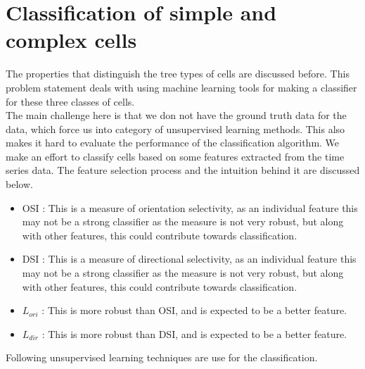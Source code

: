 \documentclass[11pt]{article}
\begin{document}
\section{Classification of simple and complex cells} %
\label{sub:classification_of_simple_and_complex_cells}
The properties that distinguish the tree types of cells are discussed before. This problem statement deals with using machine learning tools for making a classifier for these three classes of cells.\\
The main challenge here is that we don not have the ground truth data for the data, which force us into category of unsupervised learning methods. This also makes it hard to evaluate the performance of the classification algorithm. We make an effort to classify cells based on some features extracted from the time series data. The feature selection process and the intuition behind it are discussed below.
\begin{itemize}
    \item OSI : This is a measure of orientation selectivity, as an individual feature this may not be a strong classifier as the measure is not very robust, but along with other features, this could contribute towards classification.
    \item DSI : This is a measure of directional selectivity, as an individual feature this may not be a strong classifier as the measure is not very robust, but along with other features, this could contribute towards classification.
    \item $L_{ori}$ : This is more robust than OSI, and is expected to be a better feature.
    \item $L_{dir}$ : This is more robust than DSI, and is expected to be a better feature.
\end{itemize}
Following unsupervised learning techniques are use for the classification.
\end{document}
